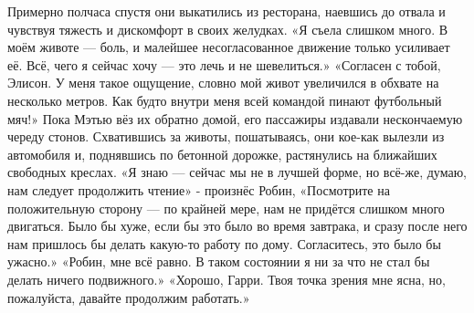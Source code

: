 \documentclass[a4paper,12pt]{book}
\begin{document}
	Примерно полчаса спустя они выкатились из ресторана, наевшись до отвала и чувствуя тяжесть и дискомфорт в своих желудках.
	«Я съела слишком много. В моём животе — боль, и малейшее несогласованное движение только усиливает её. Всё, чего я сейчас хочу — это лечь и не шевелиться.»
	«Согласен с тобой, Элисон. У меня такое ощущение, словно мой живот увеличился в обхвате на несколько метров. Как будто внутри меня всей командой пинают футбольный мяч!»
	Пока Мэтью вёз их обратно домой, его пассажиры издавали нескончаемую череду стонов. Схватившись за животы, пошатываясь, они кое-как вылезли из автомобиля и, поднявшись по бетонной дорожке, растянулись на ближайших свободных креслах.
	«Я знаю — сейчас мы не в лучшей форме, но всё-же, думаю, нам следует продолжить чтение» - произнёс Робин,
	«Посмотрите на положительную сторону — по крайней мере, нам не придётся слишком много двигаться. Было бы хуже, если бы это было во время завтрака, и сразу после него нам пришлось бы делать какую-то работу по дому. Согласитесь, это было бы ужасно.»
	«Робин, мне всё равно. В таком состоянии я ни за что не стал бы делать ничего подвижного.»
	«Хорошо, Гарри. Твоя точка зрения мне ясна, но, пожалуйста, давайте продолжим работать.»
\end{document}
